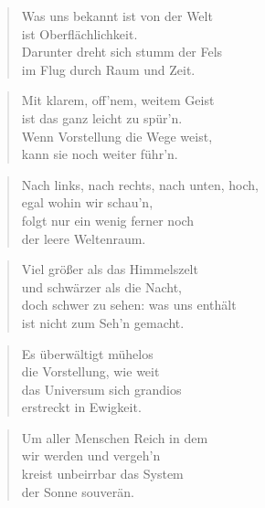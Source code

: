 \documentclass[10pt,a4paper]{article}
\begin{document}
\begin{paracol}{2}
\begin{verse}
Was uns bekannt ist von der Welt \\
ist Oberflächlichkeit. \\
Darunter dreht sich stumm der Fels \\
im Flug durch Raum und Zeit. \\
\end{verse}

\begin{verse}
Mit klarem, off’nem, weitem Geist \\
ist das ganz leicht zu spür’n. \\
Wenn Vorstellung die Wege weist, \\
kann sie noch weiter führ’n. \\
\end{verse}

\begin{verse}
Nach links, nach rechts, nach unten, hoch, \\
egal wohin wir schau’n, \\
folgt nur ein wenig ferner noch \\
der leere Weltenraum. \\
\end{verse}

\begin{verse}
Viel größer als das Himmelszelt \\
und schwärzer als die Nacht, \\
doch schwer zu sehen: was uns enthält \\
ist nicht zum Seh’n gemacht. \\
\end{verse}

\begin{verse}
Es überwältigt mühelos \\
die Vorstellung, wie weit \\
das Universum sich grandios \\
erstreckt in Ewigkeit. \\
\end{verse}

\begin{verse}
Um aller Menschen Reich in dem \\
wir werden und vergeh’n \\
kreist unbeirrbar das System \\
der Sonne souverän. \\
\end{verse}


\end{paracol}
\end{document}
